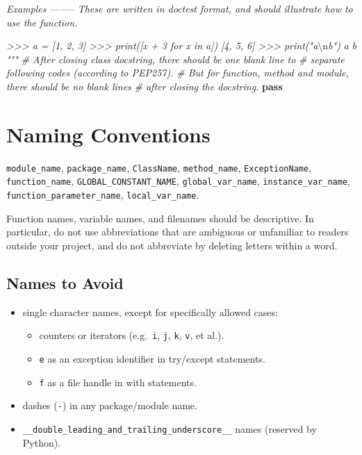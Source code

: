 \documentclass[
]{book}
\newenvironment{Shaded}{\begin{snugshade}}{\end{snugshade}}
\newcommand{\CharTok}[1]{\textcolor[rgb]{0.31,0.60,0.02}{#1}}
\newcommand{\CommentTok}[1]{\textcolor[rgb]{0.56,0.35,0.01}{\textit{#1}}}
\newcommand{\ControlFlowTok}[1]{\textcolor[rgb]{0.13,0.29,0.53}{\textbf{#1}}}
\providecommand{\tightlist}{%
  \setlength{\itemsep}{0pt}\setlength{\parskip}{0pt}}
\begin{document}
\begin{itemize}
\begin{Shaded}
\begin{Highlighting}[]
\CommentTok{    Examples}
\CommentTok{    --------}
\CommentTok{    These are written in doctest format, and should illustrate how to}
\CommentTok{    use the function.}

\CommentTok{    >>> a = [1, 2, 3]}
\CommentTok{    >>> print([x + 3 for x in a])}
\CommentTok{    [4, 5, 6]}
\CommentTok{    >>> print("a}\CharTok{\textbackslash{}n}\CommentTok{b")}
\CommentTok{    a}
\CommentTok{    b}
\CommentTok{    """}
    \CommentTok{# After closing class docstring, there should be one blank line to}
    \CommentTok{# separate following codes (according to PEP257).}
    \CommentTok{# But for function, method and module, there should be no blank lines}
    \CommentTok{# after closing the docstring.}
    \ControlFlowTok{pass}
\end{Highlighting}
\end{Shaded}
\end{itemize}

\hypertarget{naming-conventions-1}{%
\section{Naming Conventions}\label{naming-conventions-1}}

\texttt{module\_name}, \texttt{package\_name}, \texttt{ClassName}, \texttt{method\_name}, \texttt{ExceptionName},
\texttt{function\_name}, \texttt{GLOBAL\_CONSTANT\_NAME}, \texttt{global\_var\_name}, \texttt{instance\_var\_name},
\texttt{function\_parameter\_name}, \texttt{local\_var\_name}.

Function names, variable names, and filenames should be descriptive. In
particular, do not use abbreviations that are ambiguous or unfamiliar to
readers outside your project, and do not abbreviate by deleting letters within
a word.

\hypertarget{names-to-avoid}{%
\subsection{Names to Avoid}\label{names-to-avoid}}

\begin{itemize}
\tightlist
\item
  single character names, except for specifically allowed cases:

  \begin{itemize}
  \tightlist
  \item
    counters or iterators (e.g.~\texttt{i}, \texttt{j}, \texttt{k}, \texttt{v}, et al.).
  \item
    \texttt{e} as an exception identifier in try/except statements.
  \item
    \texttt{f} as a file handle in with statements.
  \end{itemize}
\item
  dashes (\texttt{-}) in any package/module name.
\item
  \texttt{\_\_double\_leading\_and\_trailing\_underscore\_\_} names (reserved by Python).
\end{itemize}
\end{document}
